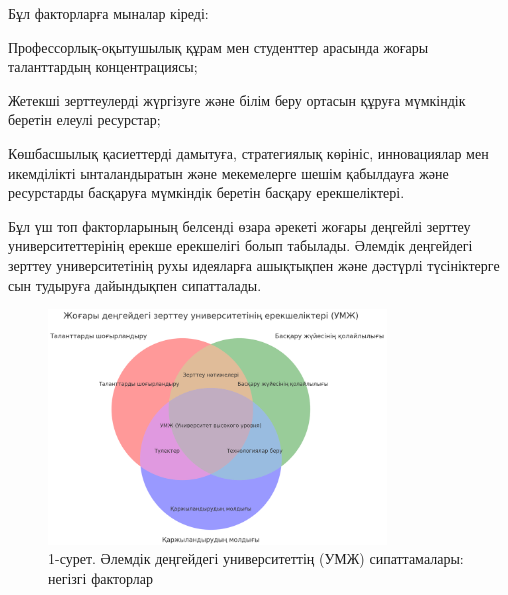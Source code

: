 \begin{multicols}{2}
Бұл факторларға мыналар кіреді:

Профессорлық-оқытушылық құрам мен студенттер арасында жоғары
таланттардың концентрациясы;

Жетекші зерттеулерді жүргізуге және білім беру ортасын құруға мүмкіндік
беретін елеулі ресурстар;

Көшбасшылық қасиеттерді дамытуға, стратегиялық көрініс, инновациялар мен
икемділікті ынталандыратын және мекемелерге шешім қабылдауға және
ресурстарды басқаруға мүмкіндік беретін басқару ерекшеліктері.


Бұл үш топ факторларының белсенді өзара әрекеті жоғары деңгейлі зерттеу
университеттерінің ерекше ерекшелігі болып табылады. Әлемдік деңгейдегі
зерттеу университетінің рухы идеяларға ашықтықпен және дәстүрлі
түсініктерге сын тудыруға дайындықпен сипатталады.
\end{multicols}


\begin{figure}[H]
	\centering
	\includegraphics[width=0.8\textwidth]{media/ekon/image4}
	\caption*{1-сурет. Әлемдік деңгейдегі университеттің (УМЖ) сипаттамалары:
  негізгі факторлар}
\end{figure}


